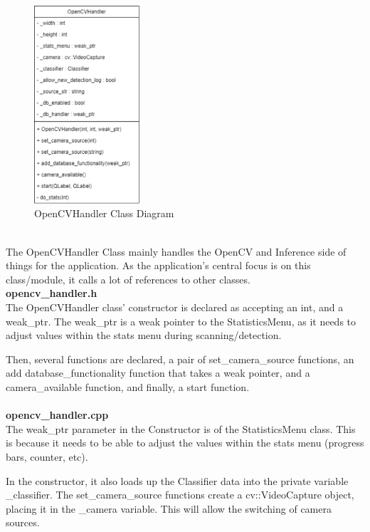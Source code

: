 \documentclass[conference]{IEEEtran}
\begin{document}
\begin{figure}[h]
    \centering
    \includegraphics[width=0.35\textwidth]{images/code_diagrams/opencvhandler_uml.eps}
    \caption{OpenCVHandler Class Diagram}
\end{figure}~\\

The OpenCVHandler Class mainly handles the OpenCV and Inference side of things for the application. As the application's central focus is on this class/module, it calls a lot of references to other classes.\\


\textbf{opencv\_handler.h}~\\

The OpenCVHandler class' constructor is declared as accepting an int, and a weak\_ptr. The weak\_ptr is a weak pointer to the StatisticsMenu, as it needs to adjust values within the stats menu during scanning/detection.

Then, several functions are declared, a pair of set\_camera\_source functions, an add database\_functionality function that takes a weak pointer, and a camera\_available function, and finally, a start function.~\\~\\


\textbf{opencv\_handler.cpp}~\\

The weak\_ptr parameter in the Constructor is of the StatisticsMenu class. This is because it needs to be able to adjust the values within the stats menu (progress bars, counter, etc).

In the constructor, it also loads up the Classifier data into the private variable \_classifier. The set\_camera\_source functions create a cv::VideoCapture object, placing it in the \_camera variable. This will allow the switching of camera sources.
\end{document}
